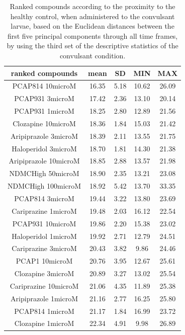 \documentclass[a4paper,12pt]{article}
\begin{document}
\begin{table}[h!]\tiny
\centering
\caption{Ranked compounds according to the proximity to the healthy control, when administered to the convulsant larvae, based on the Euclidean distances between the first five principal components through all time frames, by using the third set of the descriptive statistics of the convulsant condition.}
\begin{tabular}{|c|c|c|c|c|}
\hline
ranked compounds             & mean & SD   & MIN  & MAX   \\ \hline
PCAP814 10microM      & 16.35 & 5.18 & 10.62 & 26.09 \\ \hline
PCAP931 3microM       & 17.42 & 2.36 & 13.10  & 20.14 \\ \hline
PCAP931 1microM       & 18.25 & 2.80  & 12.89 & 21.56 \\ \hline
Clozapine 10microM    & 18.36 & 1.84 & 15.03 & 21.42 \\ \hline
Aripiprazole 3microM  & 18.39 & 2.11 & 13.55 & 21.75 \\ \hline
Haloperidol 3microM   & 18.70  & 1.81 & 14.30  & 21.38 \\ \hline
Aripiprazole 10microM & 18.85 & 2.88 & 13.57 & 21.98 \\ \hline
NDMCHigh 50microM     & 18.90  & 2.35 & 13.21 & 23.08 \\ \hline
NDMCHigh 100microM    & 18.92 & 5.42 & 13.70  & 33.35 \\ \hline
PCAP814 3microM       & 19.44 & 3.22 & 13.80  & 23.69 \\ \hline
Cariprazine 1microM   & 19.48 & 2.03 & 16.12 & 22.54 \\ \hline
PCAP931 10microM      & 19.86 & 2.20  & 15.38 & 23.02 \\ \hline
Haloperidol 1microM   & 19.92 & 2.71 & 12.79 & 24.51 \\ \hline
Cariprazine 3microM   & 20.43 & 3.82 & 9.86  & 24.46 \\ \hline
PCAP1 10microM        & 20.76 & 3.95 & 12.67 & 25.61 \\ \hline
Clozapine 3microM     & 20.89 & 3.27 & 13.02 & 25.54 \\ \hline
Cariprazine 10microM  & 21.06 & 4.35 & 11.89 & 25.38 \\ \hline
Aripiprazole 1microM  & 21.16 & 2.77 & 16.25 & 25.80  \\ \hline
PCAP814 1microM       & 21.17 & 1.84 & 16.99 & 23.72 \\ \hline
Clozapine 1microM     & 22.34 & 4.91 & 9.98  & 26.89 \\ \hline

\end{tabular}
\end{table}
\end{document}
